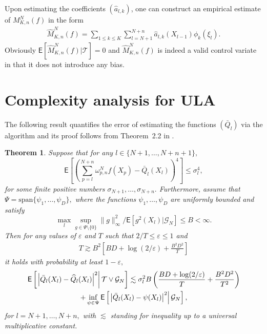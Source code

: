 \documentclass[bj]{imsart}
\def\NtrainPath{T}
\def\TrainSet{\mathcal{T}}
\newtheorem{thm}{Theorem}
\begin{document}
Upon estimating  the coefficients \((\widehat a_{l,k})\), one can construct an empirical estimate  of \(M_{K,n}^N(f)\) in the form
\begin{eqnarray*}
\widehat M_{K,n}^N(f) =\sum_{1\leq  k \le K}\sum_{l=N+1}^{N+n}\widehat a_{l,k}(X_{l-1})\phi_k(\xi_{l}).
\end{eqnarray*}
Obviously \(\mathsf{E}[\widehat M_{K,n}^N(f)|\TrainSet]=0\) and \(\widehat M_{K,n}^N(f)\) is indeed a valid control variate in that it
does not introduce any bias.

\section{Complexity analysis for ULA}
\label{sec:coeff}

The following result quantifies the error of estimating the functions \((\bar Q_l)\)
via the algorithm and its proof follows from Theorem~2.2 in \cite{audibert2011robust}.
\begin{thm}\label{berm:theorem:regression_cv}
 Suppose that for any \(l\in \{N+1,\ldots,N+n+1\},\)
\[
\mathsf{E}\left[\left(\sum_{p=l}^{N+n}\omega_{p,n}^{N}f(X_{p})-\bar Q_l(X_l)\right)^4\right]\leq \sigma_l^4,
\]
for some finite positive numbers \(\sigma_{N+1},\ldots, \sigma_{N+n}. \)
Furthermore, assume that \(\Psi=\mathrm{span}\{\psi_1,\ldots,\psi_D\},\) where the functions  \(\psi_1,\ldots,\psi_D\) are uniformly bounded and satisfy
\[
\max_{l}\sup_{g\in \Psi\setminus \{0\}} \|g\|^2_\infty/\mathsf{E}[g^2(X_l) | \mathcal{G}_N]\leq B<\infty.
\]
Then for any values of \(\varepsilon\) and \(\NtrainPath\) such that \(2/\NtrainPath\leq \varepsilon\leq 1\) and
\begin{eqnarray*}
\NtrainPath\gtrsim B^2\left[BD+\log(2/\varepsilon)+\frac{B^2D^2}{\NtrainPath}\right]
\end{eqnarray*}
it holds with probability at least \(1-\varepsilon,\)
\begin{multline}
\mathsf{E}\left[ \left.\Bigl|\bar Q_l(X_l)
-\widehat Q_l(X_l)\Bigr|^2\right | \TrainSet \vee \mathcal{G}_N\right]
\lesssim  \sigma^2_l B
\left(\frac{BD+\log(2/\varepsilon)}{\NtrainPath}+\frac{B^2D^2}{\NtrainPath^2}\right)
\\
 +
\inf_{\psi\in \Psi}
\mathsf{E}\left[\left.\left|\bar Q_l(X_{l})-\psi(X_{l})\right|^{2}\right | \mathcal{G}_N \right], \label{eq:regr_error}
\end{multline}
for \(l=N+1,\ldots,N+n,
\) with \(\lesssim\) standing for inequality up to a universal multiplicative constant.
\end{thm}
\end{document}
